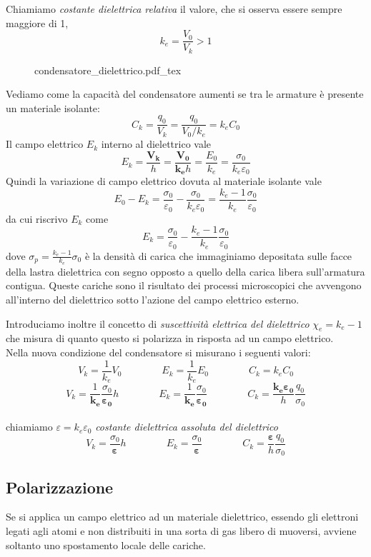 \documentclass[x11names]{report}
\newcommand{\incfig}[1]{%
	{#1.pdf_tex}
}
\begin{document}
Chiamiamo \textit{costante dielettrica relativa} il valore, che si osserva essere sempre maggiore di 1,
\[
k_e = \frac{V_0}{V_k} > 1
\] 
\begin{figure}[H]
	\centering
	\incfig{condensatore_dielettrico}
\end{figure}
Vediamo come la capacità del condensatore aumenti se tra le armature è presente un materiale isolante:
\[
C_k = \frac{q_0}{V_k} = \frac{q_0}{V_0/k_e} = k_eC_0
\]
Il campo elettrico \(E_k\) interno al dielettrico vale
\[
E_k = \frac{\boldsymbol{V_k}}{h} = \frac{\boldsymbol{V_0}}{\boldsymbol{k_e}h} = \frac{E_0}{k_e} = \frac{\sigma_0}{k_e\varepsilon_0}
\]
Quindi la variazione di campo elettrico dovuta al materiale isolante vale
\[
E_0 - E_{k} = \frac{\sigma_0}{\varepsilon_0} -  \frac{\sigma_0}{k_e\varepsilon_0} = \frac{k_e - 1}{k_e}\frac{\sigma_0}{\varepsilon_0}
\]
da cui riscrivo \(E_k\) come 
\[
E_k = \frac{\sigma_0}{\varepsilon_0} - \frac{k_e - 1}{k_e}\frac{\sigma_0}{\varepsilon_0}
\]
dove \(\sigma_p =  \frac{k_e - 1}{k_e}\sigma_0\) è la densità di carica che immaginiamo depositata sulle facce della lastra dielettrica con segno opposto a quello della carica libera sull'armatura contigua. Queste cariche sono il risultato dei processi microscopici che avvengono all'interno del dielettrico sotto l'azione del campo elettrico esterno. 

Introduciamo inoltre il concetto di \textit{suscettività elettrica del dielettrico} \(\chi_e = k_e - 1\) che  misura di quanto questo si polarizza in risposta ad un campo elettrico. \\

\noindent
Nella nuova condizione del condensatore si misurano i seguenti valori:
\[
V_k = \frac{1}{k_e}V_0 \qquad\qquad E_k = \frac{1}{k_e}E_0 \qquad\qquad C_k = k_eC_0
\]
\[
V_k = \frac{1}{\boldsymbol{k_e}}\frac{\sigma_0}{\boldsymbol{\varepsilon_0}}h \qquad\qquad E_k = \frac{1}{\boldsymbol{k_e}}\frac{\sigma_0}{\boldsymbol{\varepsilon_0}} \qquad\qquad C_k = \frac{\boldsymbol{k_e\varepsilon_0}}{h}\frac{q_0}{\sigma_0}
\]\\
chiamiamo \(\varepsilon = k_e\varepsilon_0\) \textit{costante  dielettrica assoluta del dielettrico}
\[
V_k = \frac{\sigma_0}{\boldsymbol{\varepsilon}}h \qquad\qquad E_k = \frac{\sigma_0}{\boldsymbol{\varepsilon}} \qquad\qquad C_k = \frac{\boldsymbol{\varepsilon}}{h}\frac{q_0}{\sigma_0}
\]
\subsection{Polarizzazione}
Se si applica un campo elettrico ad un materiale dielettrico, essendo gli elettroni legati agli atomi e non distribuiti in una sorta di gas libero di muoversi, avviene soltanto uno spostamento locale delle cariche.
\end{document}
